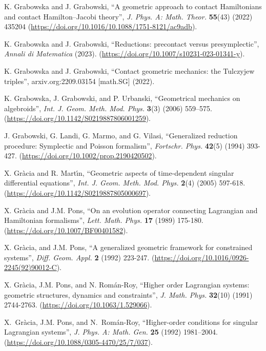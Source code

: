 \documentclass[12pt]{report}
\begin{document}
\begin{thebibliography}{999}
K. Grabowska and J. Grabowski,
``A geometric approach to contact Hamiltonians and contact Hamilton--Jacobi theory'',
{\sl J. Phys. A: Math. Theor.} {\bf 55}(43) (2022) 435204
(\url{https://doi.org/10.1016/10.1088/1751-8121/ac9adb}).

K. Grabowska and J. Grabowski,
``Reductions: precontact versus presymplectic'',
{\sl Annali di Matematica} (2023). 
(\url{https://doi.org/10.1007/s10231-023-01341-y}).

K. Grabowska and J. Grabowski,
``Contact geometric mechanics: the Tulczyjew triples'',
arxiv.org:2209.03154 [math.SG] (2022).

K. Grabowska, J. Grabowski, and P. Urbanski,
``Geometrical mechanics on algebroids'',
{\sl Int. J. Geom. Meth. Mod. Phys.} {\bf 3}(3) (2006) 559--575.
(\url{https://doi.org/10.1142/S0219887806001259}).

J. Grabowski, G. Landi, G. Marmo, and G. Vilasi,
``Generalized reduction procedure: Symplectic and Poisson formalism'',
{\sl Fortschr. Phys.} {\bf 42}(5) (1994) 393-427.
(\url{https://doi.org/10.1002/prop.2190420502}).

{\rm X. Gr\`acia and R. Mart\'\i n}, 
``Geometric aspects of time-dependent singular differential equations'', 
{\sl Int. J. Geom. Meth. Mod. Phys.} {\bf 2}(4) (2005) 597-618.
(\url{https://doi.org/10.1142/S0219887805000697}).

X. Gr\`acia and J.M. Pons,
 ``On an evolution operator connecting Lagrangian and Hamiltonian formalisms'', 
{\sl Lett. Math. Phys.} {\bf 17} (1989) 175-180.
(\url{https://doi.org/10.1007/BF00401582}).

X. Gr\`acia, and J.M. Pons,
``A generalized geometric framework for constrained systems'',
{\sl Diff. Geom. Appl.} {\bf 2} (1992) 223-247.
(\url{https://doi.org/10.1016/0926-2245(92)90012-C}).

X. Gr\`acia, J.M. Pons, and N. Rom\'an-Roy,
``Higher order Lagrangian systems: geometric structures, dynamics and constraints'',
{\sl J. Math. Phys.} {\bf 32}(10) (1991) 2744-2763.
(\url{https://doi.org/10.1063/1.529066}).

X.~{Gr\`{a}cia}, J.M. {Pons}, and N.~{Rom\'{a}n-Roy}, 
``Higher-order conditions for singular {Lagrangian} systems'', 
\textsl{J. Phys. A: Math. Gen.}
  \textbf{25} (1992) 1981--2004.
(\url{https://doi.org/10.1088/0305-4470/25/7/037}).


\end{thebibliography}
\end{document}
